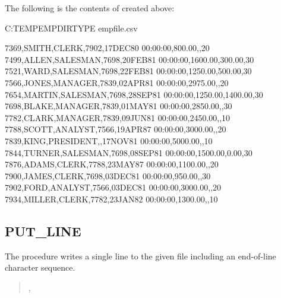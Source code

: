 \documentclass[letterpaper,10pt,english,openany,oneside]{sphinxmanual}
\begin{document}
The following is the contents of  created above:

%
\begin{sphinxVerbatim}[commandchars=\\\{\}]
C:\PYGZbs{}TEMP\PYGZbs{}EMPDIR\PYGZgt{}TYPE empfile.csv

7369,SMITH,CLERK,7902,17\PYGZhy{}DEC\PYGZhy{}80 00:00:00,800.00,,20
7499,ALLEN,SALESMAN,7698,20\PYGZhy{}FEB\PYGZhy{}81 00:00:00,1600.00,300.00,30
7521,WARD,SALESMAN,7698,22\PYGZhy{}FEB\PYGZhy{}81 00:00:00,1250.00,500.00,30
7566,JONES,MANAGER,7839,02\PYGZhy{}APR\PYGZhy{}81 00:00:00,2975.00,,20
7654,MARTIN,SALESMAN,7698,28\PYGZhy{}SEP\PYGZhy{}81 00:00:00,1250.00,1400.00,30
7698,BLAKE,MANAGER,7839,01\PYGZhy{}MAY\PYGZhy{}81 00:00:00,2850.00,,30
7782,CLARK,MANAGER,7839,09\PYGZhy{}JUN\PYGZhy{}81 00:00:00,2450.00,,10
7788,SCOTT,ANALYST,7566,19\PYGZhy{}APR\PYGZhy{}87 00:00:00,3000.00,,20
7839,KING,PRESIDENT,,17\PYGZhy{}NOV\PYGZhy{}81 00:00:00,5000.00,,10
7844,TURNER,SALESMAN,7698,08\PYGZhy{}SEP\PYGZhy{}81 00:00:00,1500.00,0.00,30
7876,ADAMS,CLERK,7788,23\PYGZhy{}MAY\PYGZhy{}87 00:00:00,1100.00,,20
7900,JAMES,CLERK,7698,03\PYGZhy{}DEC\PYGZhy{}81 00:00:00,950.00,,30
7902,FORD,ANALYST,7566,03\PYGZhy{}DEC\PYGZhy{}81 00:00:00,3000.00,,20
7934,MILLER,CLERK,7782,23\PYGZhy{}JAN\PYGZhy{}82 00:00:00,1300.00,,10
\end{sphinxVerbatim}

\newpage

\ignorespaces 

\subsection{PUT\_LINE}
\label{\detokenize{utl_file:index-13}}\label{\detokenize{utl_file:put-line}}
The  procedure writes a single line to the given file including
an end-of-line character sequence.
\begin{quote}

\begin{DUlineblock}{0em}
\item[] ,
\item[] 
\end{DUlineblock}
\end{quote}

\end{document}
